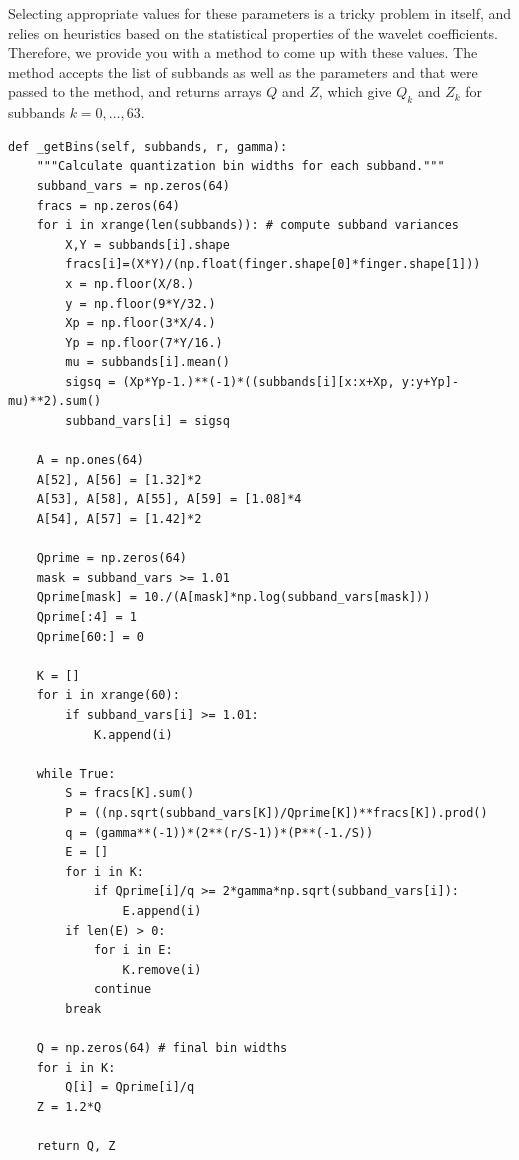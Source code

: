 Selecting appropriate values for these parameters is a tricky problem in itself, and relies on heuristics
based on the statistical properties of the wavelet coefficients.
Therefore, we provide you with a method to come up with these values.
The method accepts the list of subbands as well as the parameters  and 
that were passed to the  method, and returns arrays $Q$ and $Z$,
which give $Q_k$ and $Z_k$ for subbands $k=0,\ldots,63$.
\begin{lstlisting}
def _getBins(self, subbands, r, gamma):
    """Calculate quantization bin widths for each subband."""
    subband_vars = np.zeros(64)
    fracs = np.zeros(64)
    for i in xrange(len(subbands)): # compute subband variances
        X,Y = subbands[i].shape
        fracs[i]=(X*Y)/(np.float(finger.shape[0]*finger.shape[1]))
        x = np.floor(X/8.)
        y = np.floor(9*Y/32.)
        Xp = np.floor(3*X/4.)
        Yp = np.floor(7*Y/16.)
        mu = subbands[i].mean()
        sigsq = (Xp*Yp-1.)**(-1)*((subbands[i][x:x+Xp, y:y+Yp]-mu)**2).sum()
        subband_vars[i] = sigsq

    A = np.ones(64)
    A[52], A[56] = [1.32]*2
    A[53], A[58], A[55], A[59] = [1.08]*4
    A[54], A[57] = [1.42]*2

    Qprime = np.zeros(64)
    mask = subband_vars >= 1.01
    Qprime[mask] = 10./(A[mask]*np.log(subband_vars[mask]))
    Qprime[:4] = 1
    Qprime[60:] = 0

    K = []
    for i in xrange(60):
        if subband_vars[i] >= 1.01:
            K.append(i)

    while True:
        S = fracs[K].sum()
        P = ((np.sqrt(subband_vars[K])/Qprime[K])**fracs[K]).prod()
        q = (gamma**(-1))*(2**(r/S-1))*(P**(-1./S))
        E = []
        for i in K:
            if Qprime[i]/q >= 2*gamma*np.sqrt(subband_vars[i]):
                E.append(i)
        if len(E) > 0:
            for i in E:
                K.remove(i)
            continue
        break

    Q = np.zeros(64) # final bin widths
    for i in K:
        Q[i] = Qprime[i]/q
    Z = 1.2*Q

    return Q, Z
\end{lstlisting}

